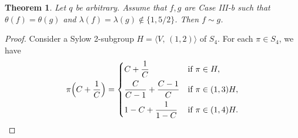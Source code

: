 \documentclass{amsart}
\newtheorem{thm}{Theorem}[section]
\numberwithin{equation}{section}
\theoremstyle{definition}
\begin{document}
\begin{thm}\label{T6.3}
Let $q$ be arbitrary. Assume that $f,g$ are Case III-b such that $\theta(f)=\theta(g)$ and $\lambda(f)=\lambda(g)\notin\{1,5/2\}$. Then $f\sim g$.
\end{thm}

\begin{proof}
Consider a Sylow 2-subgroup $H=\langle V,\, (1,2)\rangle$ of $S_4$. For each $\pi\in S_4$, we have
\begin{equation}\label{pi}
\pi\Bigl(C+\frac 1C\Bigr)=
\begin{cases}
\displaystyle C+\frac 1C&\text{if}\ \pi\in H,\vspace{0.4em}\cr
\displaystyle \frac C{C-1}+\frac {C-1}C&\text{if}\ \pi\in (1,3)H,\vspace{0.4em}\cr
\displaystyle 1-C+\frac 1{1-C}&\text{if}\ \pi\in (1,4)H.
\end{cases}
\end{equation}


\end{proof}
\end{document}

